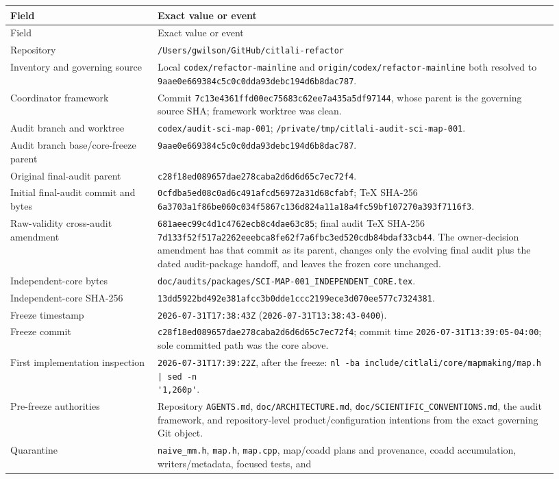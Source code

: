 \documentclass[11pt]{article}
\newcommand{\code}[1]{\nolinkurl{#1}}
\newcommand{\gitsha}[5]{\texttt{#1\allowbreak#2\allowbreak#3\allowbreak#4\allowbreak#5}}
\newcommand{\digest}[8]{\texttt{#1\allowbreak#2\allowbreak#3\allowbreak#4\allowbreak#5\allowbreak#6\allowbreak#7\allowbreak#8}}
\newcommand{\AuditGoverningSHA}{\gitsha{9aae0e66}{9384c5c0}{c0dda93d}{ebc194d6}{b8dac787}}
\newcommand{\AuditBranch}{\code{codex/audit-sci-map-001}}
\newcommand{\AuditWorktree}{\code{/private/tmp/citlali-audit-sci-map-001}}
\newcommand{\AuditCorePath}{\code{doc/audits/packages/SCI-MAP-001_INDEPENDENT_CORE.tex}}
\newcommand{\AuditCoreSHA}{\digest{13dd5922}{bd492e38}{1afcc3b0}{15284216}{dde1ccc2}{199ece3d}{070ee577}{c7324381}}
\newcommand{\AuditCoreFreezeCommit}{\gitsha{c28f18ed}{089657da}{e278caba}{2d6d6d65}{c7ec72f4}}
\newcommand{\AuditInitialFinalCommit}{\gitsha{0cfdba5e}{d08c0ad6}{c491afcd}{56972a31}{d68cfabf}}
\newcommand{\AuditInitialFinalSHA}{\digest{6a3703a1}{f86be060}{c034f586}{7c136d82}{4a11a18a}{4fc59bf1}{07270a39}{3f7116f3}}
\newcommand{\AuditRawValidityAmendmentCommit}{\gitsha{681aeec9}{9c4d1c47}{62ecb8c4}{dae63c85}{99638678}}
\newcommand{\AuditRawValidityAmendmentSHA}{\digest{7d133f52}{f517a226}{2eeebca8}{fe62f7a6}{fbc3ed52}{09687022}{0cdb84bd}{af33cb44}}
\begin{document}
\begin{longtable}{L{0.25\linewidth}L{0.68\linewidth}}
\toprule
Field & Exact value or event\\
\midrule
\endfirsthead
\toprule
Field & Exact value or event\\
\midrule
\endhead
Repository & \code{/Users/gwilson/GitHub/citlali-refactor}\\
Inventory and governing source & Local \code{codex/refactor-mainline} and
\code{origin/codex/refactor-mainline} both resolved to
\AuditGoverningSHA.\\
Coordinator framework & Commit
\code{7c13e4361ffd00ec75683c62ee7a435a5df97144}, whose parent is the governing
source SHA; framework worktree was clean.\\
Audit branch and worktree & \AuditBranch; \AuditWorktree.\\
Audit branch base/core-freeze parent & \AuditGoverningSHA.\\
Original final-audit parent & \AuditCoreFreezeCommit.\\
Initial final-audit commit and bytes & \AuditInitialFinalCommit; TeX SHA-256
\AuditInitialFinalSHA.\\
Raw-validity cross-audit amendment & \AuditRawValidityAmendmentCommit; final
audit TeX SHA-256 \AuditRawValidityAmendmentSHA.  The owner-decision amendment
has that commit as its parent, changes only the evolving final audit plus the
dated audit-package handoff, and leaves the frozen core unchanged.\\
Independent-core bytes & \AuditCorePath.\\
Independent-core SHA-256 & \AuditCoreSHA.\\
Freeze timestamp & \code{2026-07-31T17:38:43Z}
(\code{2026-07-31T13:38:43-0400}).\\
Freeze commit & \AuditCoreFreezeCommit; commit time
\code{2026-07-31T13:39:05-04:00}; sole committed path was the core above.\\
First implementation inspection & \code{2026-07-31T17:39:22Z}, after the
freeze: \code{nl -ba include/citlali/core/mapmaking/map.h | sed -n
'1,260p'}.\\
Pre-freeze authorities & Repository \code{AGENTS.md},
\code{doc/ARCHITECTURE.md}, \code{doc/SCIENTIFIC_CONVENTIONS.md}, the audit
framework, and repository-level product/configuration intentions from the exact
governing Git object.\\
Quarantine & \code{naive_mm.h}, \code{map.h}, \code{map.cpp}, map/coadd plans
and provenance, coadd accumulation, writers/metadata, focused tests, and

\end{longtable}
\end{document}
